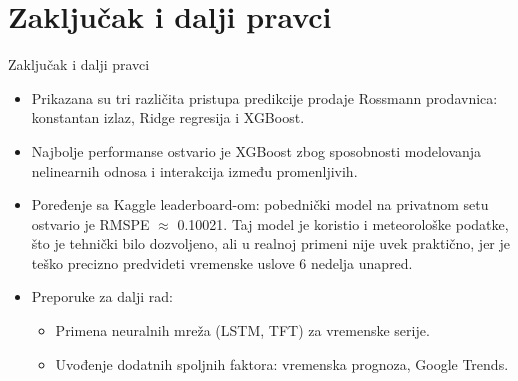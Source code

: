 \documentclass[serif, aspectratio=169]{beamer}
\begin{document}
\section{Zaključak i dalji pravci}
\begin{frame}{Zaključak i dalji pravci}
\begin{itemize}
    \item Prikazana su tri različita pristupa predikcije prodaje Rossmann prodavnica: konstantan izlaz, Ridge regresija i XGBoost.
    \item Najbolje performanse ostvario je XGBoost zbog sposobnosti modelovanja nelinearnih odnosa i interakcija između promenljivih.
    \item Poređenje sa Kaggle leaderboard-om: pobednički model na privatnom setu ostvario je RMSPE $\approx$ 0.10021. Taj model je koristio i meteorološke podatke, što je tehnički bilo dozvoljeno, ali u realnoj primeni nije uvek praktično, jer je teško precizno predvideti vremenske uslove 6 nedelja unapred.
    \item Preporuke za dalji rad:
    \begin{itemize}
        \item Primena neuralnih  mreža (LSTM, TFT) za vremenske serije.
        \item Uvođenje dodatnih spoljnih faktora: vremenska prognoza, Google Trends.
    \end{itemize}
\end{itemize}
\end{frame}
\end{document}
